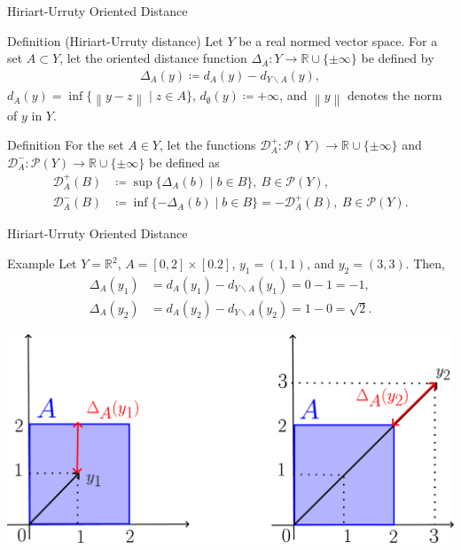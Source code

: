 \documentclass[aspectratio=169, dvipdfmx, 11pt]{beamer}
\newcommand{\RealNumberSet}{\mathbb{R}}
\newcommand{\Norm}[1]{\left\lVert {#1} \right\rVert} %
\begin{document}
\begin{frame}{Hiriart-Urruty Oriented Distance}
  \begin{block}{Definition (Hiriart-Urruty distance)}
    Let $Y$ be a real normed vector space. For a set $A \subset Y$, let the oriented distance function
    $\Delta_{A} \colon Y \to \RealNumberSet\cup\{\pm \infty\}$ be defined by
    \begin{align*}
      \Delta_{A}(y) \coloneq d_{A} (y) - d_{Y \backslash A}(y),
    \end{align*}
    $ d_{A} (y)= \inf\{\Norm{y - z} \mid z \in A\}$, $d_{\emptyset} (y) \coloneq + \infty$,
    and $\Norm{y}$ denotes the norm of $y$ in $Y$.
  \end{block}

  \begin{block}{Definition}
    For the set $A \in Y$, let the functions $\mathcal{D}^{+}_{A} \colon \mathcal{P}(Y) \to \RealNumberSet \cup \{\pm \infty\}$
    and $\mathcal{D}^{-}_{A} \colon \mathcal{P}(Y) \to \RealNumberSet \cup \{\pm \infty\}$ be defined as
    \begin{align*}
      \mathcal{D}^{+}_{A}(B) & \coloneq \sup\{\Delta_{A}(b) \mid b \in B\},\: B \in \mathcal{P}(Y),                            \\
      \mathcal{D}^{-}_{A}(B) & \coloneq \inf\{-\Delta_{A}(b) \mid b \in B\} = -\mathcal{D}^{+}_{A}(B),\: B \in \mathcal{P}(Y).
    \end{align*}
  \end{block}
\end{frame}

\begin{frame}{Hiriart-Urruty Oriented Distance}
  \begin{exampleblock}{Example}
    Let $Y = \RealNumberSet^{2}$, $A = [0,2] \times [0.2]$, $y_{1} = (1,1)$, and $y_{2} = (3, 3)$. Then,
    \begin{align*}
      \Delta_{A}(y_{1}) & = d_{A}(y_{1}) - d_{Y \backslash A}(y_{1}) = 0 - 1 = -1,        \\
      \Delta_{A}(y_{2}) & = d_{A}(y_{2}) - d_{Y \backslash A}(y_{2}) = 1 - 0 = \sqrt{2} .
    \end{align*}
  \end{exampleblock}
  \centering
  \includegraphics[keepaspectratio, scale=0.10]{figures/eps/hiriart-urruty_distance_example.eps}
\end{frame}
\end{document}
